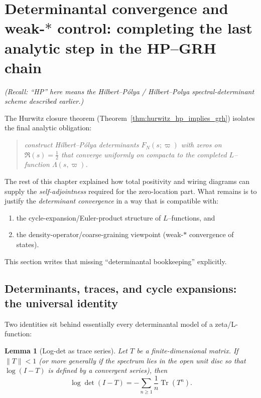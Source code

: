 \documentclass[11pt,oneside]{amsbook}
\numberwithin{equation}{section}
\theoremstyle{plain}
\newtheorem{lemma}[theorem]{Lemma}
\theoremstyle{definition}
\theoremstyle{remark}
\DeclareMathOperator{\Tr}{\mathrm{Tr}}
\begin{document}
\section{Determinantal convergence and weak-$\ast$ control: completing the last analytic step in the HP--GRH chain}
\noindent\emph{(Recall: ``HP'' here means the Hilbert--P\'olya / Hilbert--Polya spectral-determi\-nant scheme described earlier.)}
\label{sec:determinantal_convergence_weakstar_hp}

The Hurwitz closure theorem (Theorem~\ref{thm:hurwitz_hp_implies_grh}) isolates the final analytic obligation:
\begin{quote}
\emph{construct Hilbert--Pólya determinants $F_N(s;\varpi)$ with zeros on $\Re(s)=\tfrac12$ that converge uniformly on compacta to the completed $L$--function $\Lambda(s,\varpi)$.}
\end{quote}
The rest of this chapter explained how total positivity and wiring diagrams can supply the \emph{self-adjointness} required for the zero-location part.
What remains is to justify the \emph{determinant convergence} in a way that is compatible with:
\begin{enumerate}[label=(\roman*)]
\item the cycle-expansion/Euler-product structure of $L$--functions, and
\item the density-operator/coarse-graining viewpoint (weak-$\ast$ convergence of states).
\end{enumerate}
This section writes that missing ``determinantal bookkeeping'' explicitly.

\subsection{Determinants, traces, and cycle expansions: the universal identity}
\label{sec:det_trace_cycle_identity}

Two identities sit behind essentially every determinantal model of a zeta/L-function:

\begin{lemma}[Log-det as trace series]
\label{lem:logdet_trace_series}
Let $T$ be a finite-dimensional matrix.
If $\|T\|<1$ (or more generally if the spectrum lies in the open unit disc so that $\log(I-T)$ is defined by a convergent series), then
\begin{equation}
\label{eq:logdet_trace}
\log\det(I-T) = -\sum_{n\ge 1}\frac{1}{n}\Tr(T^n).
\end{equation}
\end{lemma}
\end{document}
